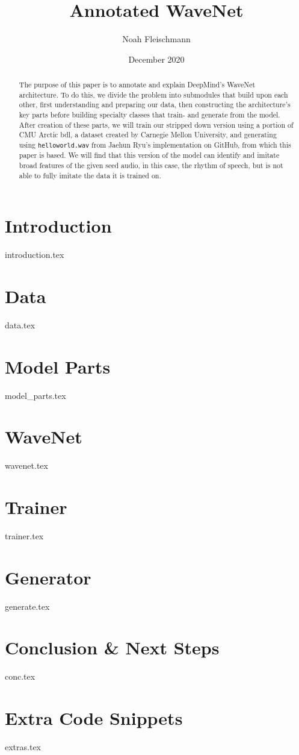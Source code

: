 \documentclass[10pt, letterpaper]{article}
\title{Annotated WaveNet}
\author{Noah Fleischmann}
\date{December 2020}
\def\code#1{\texttt{#1}}
\begin{document}
\maketitle

\begin{abstract}
    The purpose of this paper is to annotate and explain DeepMind's WaveNet architecture. To do this, we divide the problem into submodules that build upon each other, first understanding and preparing our data, then constructing the architecture's key parts before building specialty classes that train- and generate from the model. After creation of these parts, we will train our stripped down version using a portion of CMU Arctic bdl, a dataset created by Carnegie Mellon University, and generating using \code{helloworld.wav} from Jaehun Ryu's implementation on GitHub, from which this paper is based. We will find that this version of the model can identify and imitate broad features of the given seed audio, in this case, the rhythm of speech, but is not able to fully imitate the data it is trained on.
\end{abstract}

\section{Introduction}
{introduction.tex}

\section{Data}
{data.tex}

\section{Model Parts}
{model_parts.tex}

\section{WaveNet}
{wavenet.tex}

\section{Trainer}
{trainer.tex}

\newpage
\section{Generator}
{generate.tex}

\section{Conclusion \& Next Steps}
{conc.tex}

\appendix

\newpage
\section{Extra Code Snippets}
{extras.tex}
\end{document}
